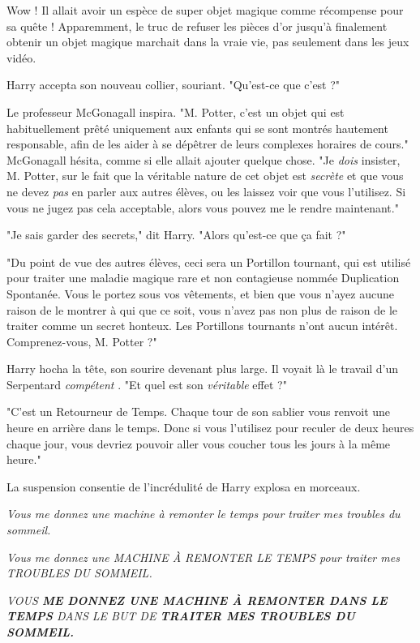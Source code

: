 Wow ! Il allait avoir un espèce de super objet magique comme récompense pour sa quête ! Apparemment, le truc de refuser les pièces d'or jusqu'à finalement obtenir un objet magique marchait dans la vraie vie, pas seulement dans les jeux vidéo.

Harry accepta son nouveau collier, souriant. "Qu'est-ce que c'est ?"

Le professeur McGonagall inspira. "M. Potter, c'est un objet qui est habituellement prêté uniquement aux enfants qui se sont montrés hautement responsable, afin de les aider à se dépêtrer de leurs complexes horaires de cours." McGonagall hésita, comme si elle allait ajouter quelque chose. "Je \emph{dois}  insister, M. Potter, sur le fait que la véritable nature de cet objet est \emph{secrète}  et que vous ne devez \emph{pas}  en parler aux autres élèves, ou les laissez voir que vous l'utilisez. Si vous ne jugez pas cela acceptable, alors vous pouvez me le rendre maintenant."

"Je sais garder des secrets," dit Harry. "Alors qu'est-ce que ça fait ?"

"Du point de vue des autres élèves, ceci sera un Portillon tournant, qui est utilisé pour traiter une maladie magique rare et non contagieuse nommée Duplication Spontanée. Vous le portez sous vos vêtements, et bien que vous n'ayez aucune raison de le montrer à qui que ce soit, vous n'avez pas non plus de raison de le traiter comme un secret honteux. Les Portillons tournants n'ont aucun intérêt. Comprenez-vous, M. Potter ?"

Harry hocha la tête, son sourire devenant plus large. Il voyait là le travail d'un Serpentard \emph{compétent} . "Et quel est son \emph{véritable}  effet ?"

"C'est un Retourneur de Temps. Chaque tour de son sablier vous renvoit une heure en arrière dans le temps. Donc si vous l'utilisez pour reculer de deux heures chaque jour, vous devriez pouvoir aller vous coucher tous les jours à la même heure."

La suspension consentie de l'incrédulité de Harry explosa en morceaux.

\emph{Vous me donnez une machine à remonter le temps pour traiter mes troubles du sommeil.} 

\emph{Vous me donnez une MACHINE À REMONTER LE TEMPS pour traiter mes TROUBLES DU SOMMEIL.} 

\emph{VOUS \textbf{ME DONNEZ UNE MACHINE À REMONTER DANS LE TEMPS } DANS LE BUT DE \textbf{TRAITER MES TROUBLES DU SOMMEIL.} } 

